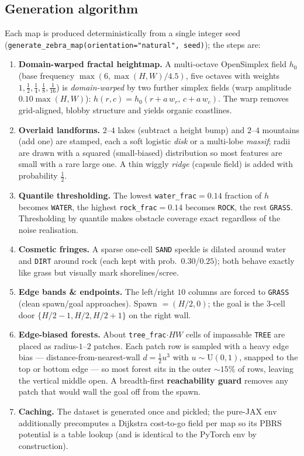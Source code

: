 \documentclass[11pt]{article}
\newcommand{\code}[1]{\texttt{#1}}
\begin{document}
\subsection{Generation algorithm}
Each map is produced deterministically from a single integer seed
(\code{generate\_zebra\_map(orientation="natural", seed)}); the steps are:
\begin{enumerate}[leftmargin=1.4em, itemsep=2pt]
\item \textbf{Domain-warped fractal heightmap.} A multi-octave OpenSimplex field
$h_0$ (base frequency $\max(6,\max(H,W)/4.5)$, five octaves with weights
$1,\tfrac12,\tfrac14,\tfrac18,\tfrac1{16}$) is \emph{domain-warped} by two further
simplex fields (warp amplitude $0.10\max(H,W)$): $h(r,c)=h_0(r+a\,w_r,\,c+a\,w_c)$.
The warp removes grid-aligned, blobby structure and yields organic coastlines.
\item \textbf{Overlaid landforms.} $2$--$4$ lakes (subtract a height bump) and
$2$--$4$ mountains (add one) are stamped, each a soft logistic \emph{disk} or a
multi-lobe \emph{massif}; radii are drawn with a squared (small-biased)
distribution so most features are small with a rare large one. A thin wiggly
\emph{ridge} (capsule field) is added with probability $\tfrac12$.
\item \textbf{Quantile thresholding.} The lowest \code{water\_frac}$=0.14$ fraction
of $h$ becomes \code{WATER}, the highest \code{rock\_frac}$=0.14$ becomes
\code{ROCK}, the rest \code{GRASS}. Thresholding by quantile makes obstacle
coverage exact regardless of the noise realisation.
\item \textbf{Cosmetic fringes.} A sparse one-cell \code{SAND} speckle is dilated
around water and \code{DIRT} around rock (each kept with prob.\ $0.30$/$0.25$);
both behave exactly like grass but visually mark shorelines/scree.
\item \textbf{Edge bands \& endpoints.} The left/right $10$ columns are forced to
\code{GRASS} (clean spawn/goal approaches). Spawn $=(H/2,0)$; the goal is the
$3$-cell door $\{H/2{-}1,H/2,H/2{+}1\}$ on the right wall.
\item \textbf{Edge-biased forests.} About \code{tree\_frac}$\cdot HW$ cells of
impassable \code{TREE} are placed as radius-$1$--$2$ patches. Each patch row is
sampled with a heavy edge bias --- distance-from-nearest-wall $d=\tfrac12 u^3$ with
$u\!\sim\!\mathrm{U}(0,1)$, snapped to the top or bottom edge --- so most forest
sits in the outer ${\sim}15\%$ of rows, leaving the vertical middle open. A
breadth-first \textbf{reachability guard} removes any patch that would wall the
goal off from the spawn.
\item \textbf{Caching.} The dataset is generated once and pickled; the pure-JAX
env additionally precomputes a Dijkstra cost-to-go field per map so its PBRS
potential is a table lookup (and is identical to the PyTorch env by construction).
\end{enumerate}
\end{document}
